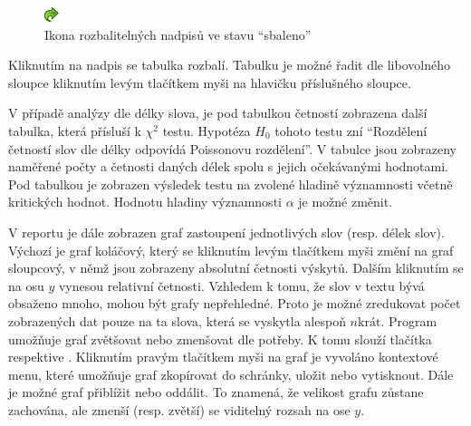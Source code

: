 \documentclass[dp.tex]{subfiles}
\begin{document}
\begin{figure}[H]
\centering
\includegraphics[max width=\textwidth,keepaspectratio=true]{imgs-60-aplikace/gui-toggle-healine}
\caption{Ikona rozbalitelných nadpisů ve stavu \enquote{sbaleno}}
\label{fig:gui-toggle-healine}
\end{figure}

Kliknutím na nadpis se tabulka rozbalí. Tabulku je možné řadit dle libovolného sloupce kliknutím levým tlačítkem myši na hlavičku příslušného sloupce.

V případě analýzy dle délky slova, je pod tabulkou četností zobrazena další tabulka, která přísluší k $\chi^2$ testu. Hypotéza $H_0$ tohoto testu zní \enquote{Rozdělení četností slov dle délky odpovídá Poissonovu rozdělení}. V tabulce jsou zobrazeny naměřené počty a četnosti daných délek spolu s jejich očekávanými hodnotami. Pod tabulkou je zobrazen výsledek testu na zvolené hladině významnosti včetně kritických hodnot. Hodnotu hladiny významnosti  $\alpha$ je možné změnit.

V reportu je dále zobrazen graf zastoupení jednotlivých slov (resp. délek slov). Výchozí je graf koláčový, který se kliknutím levým tlačítkem myši změní na graf sloupcový, v němž jsou zobrazeny absolutní četnosti výskytů. Dalším kliknutím se na osu $y$ vynesou relativní četnosti. Vzhledem k tomu, že slov v textu bývá obsaženo mnoho, mohou být grafy nepřehledné. Proto je možné zredukovat počet zobrazených dat pouze na ta slova, která se vyskytla alespoň $n\text{krát}$. Program umožňuje graf zvětšovat nebo zmenšovat dle potřeby. K tomu slouží tlačítka  respektive . Kliknutím pravým tlačítkem myši na graf je vyvoláno kontextové menu, které umožňuje graf zkopírovat do schránky, uložit nebo vytisknout. Dále je možné graf přiblížit nebo oddálit. To znamená, že velikost grafu zůstane zachována, ale zmenší (resp. zvětší) se viditelný rozsah na ose $y$.
\end{document}
